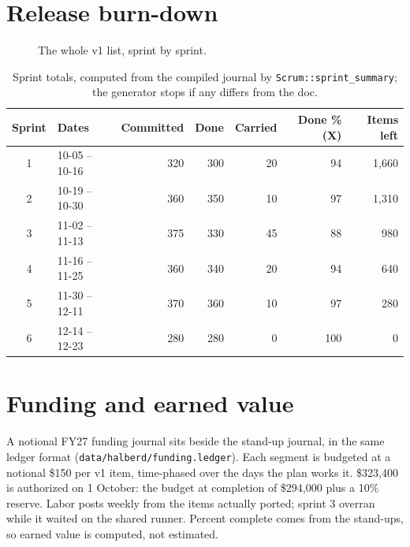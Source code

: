 \documentclass[12pt,letterpaper,oneside]{article}
\newcommand{\figfont}{\fontsize{9}{11}\selectfont}   %
\begin{document}
\section{Release burn-down}
\begin{figure}[H]\centering
{}
\caption{The whole v1 list, sprint by sprint.}
\end{figure}
\begin{table}[H]\centering\figfont
\begin{tabular}{@{}c l r r r r r@{}}
\toprule
Sprint & Dates & Committed & Done & Carried & Done \% (X) & Items left \\
\midrule
1 & 10-05 -- 10-16 & 320 & 300 & 20 & 94 & 1,660 \\
2 & 10-19 -- 10-30 & 360 & 350 & 10 & 97 & 1,310 \\
3 & 11-02 -- 11-13 & 375 & 330 & 45 & 88 & 980 \\
4 & 11-16 -- 11-25 & 360 & 340 & 20 & 94 & 640 \\
5 & 11-30 -- 12-11 & 370 & 360 & 10 & 97 & 280 \\
6 & 12-14 -- 12-23 & 280 & 280 & 0 & 100 & 0 \\
\bottomrule
\end{tabular}
\caption{Sprint totals, computed from the compiled journal by \texttt{Scrum::sprint\_summary}; the generator stops if any differs from the doc.}
\end{table}
\section{Funding and earned value}
A notional FY27 funding journal sits beside the stand-up journal, in the same ledger format (\texttt{data/halberd/funding.ledger}). Each segment is budgeted at a notional \$150 per v1 item, time-phased over the days the plan works it. \$323,400 is authorized on 1 October: the budget at completion of \$294,000 plus a 10\% reserve. Labor posts weekly from the items actually ported; sprint 3 overran while it waited on the shared runner. Percent complete comes from the stand-ups, so earned value is computed, not estimated.
\end{document}
